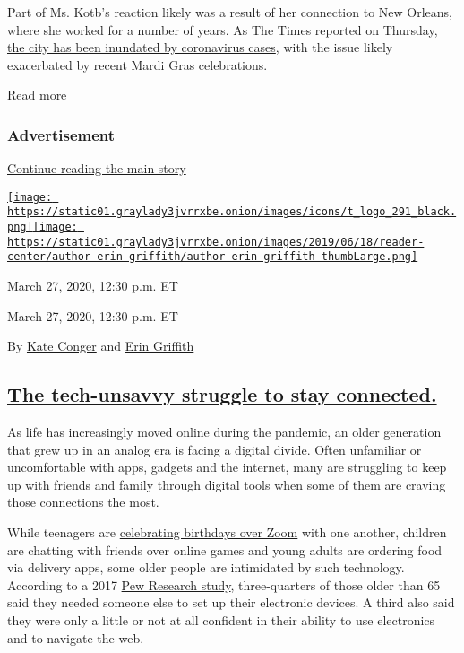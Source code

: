 Part of Ms. Kotb's reaction likely was a result of her connection to New
Orleans, where she worked for a number of years. As The Times reported
on Thursday,
\href{https://www.nytimes3xbfgragh.onion/2020/03/26/us/coronavirus-louisiana-new-orleans.html}{the
city has been inundated by coronavirus cases}, with the issue likely
exacerbated by recent Mardi Gras celebrations.

Read more

\hypertarget{advertisement-3}{%
\subsubsection{Advertisement}\label{advertisement-3}}

\protect\hyperlink{after-dfp-ad-mid4}{Continue reading the main story}

\href{https://www.nytimes3xbfgragh.onion/by/kate-conger}{\texttt{[image: https://static01.graylady3jvrrxbe.onion/images/icons/t\_logo\_291\_black.png]}}\href{https://www.nytimes3xbfgragh.onion/by/erin-griffith}{\texttt{[image: https://static01.graylady3jvrrxbe.onion/images/2019/06/18/reader-center/author-erin-griffith/author-erin-griffith-thumbLarge.png]}}

March 27, 2020, 12:30 p.m. ET

March 27, 2020, 12:30 p.m. ET

By \href{https://www.nytimes3xbfgragh.onion/by/kate-conger}{Kate Conger}
and \href{https://www.nytimes3xbfgragh.onion/by/erin-griffith}{Erin
Griffith}

\hypertarget{the-tech-unsavvy-struggle-to-stay-connected}{%
\subsection{\texorpdfstring{\protect\hyperlink{the-tech-unsavvy-struggle-to-stay-connected}{The
tech-unsavvy struggle to stay
connected.}}{The tech-unsavvy struggle to stay connected.}}\label{the-tech-unsavvy-struggle-to-stay-connected}}

As life has increasingly moved online during the pandemic, an older
generation that grew up in an analog era is facing a digital divide.
Often unfamiliar or uncomfortable with apps, gadgets and the internet,
many are struggling to keep up with friends and family through digital
tools when some of them are craving those connections the most.

While teenagers are
\href{https://www.nytimes3xbfgragh.onion/2020/03/17/style/zoom-parties-coronavirus-memes.html}{celebrating
birthdays over Zoom} with one another, children are chatting with
friends over online games and young adults are ordering food via
delivery apps, some older people are intimidated by such technology.
According to a 2017
\href{https://www.pewresearch.org/internet/2017/05/17/barriers-to-adoption-and-attitudes-towards-technology/}{Pew
Research study}, three-quarters of those older than 65 said they needed
someone else to set up their electronic devices. A third also said they
were only a little or not at all confident in their ability to use
electronics and to navigate the web.

